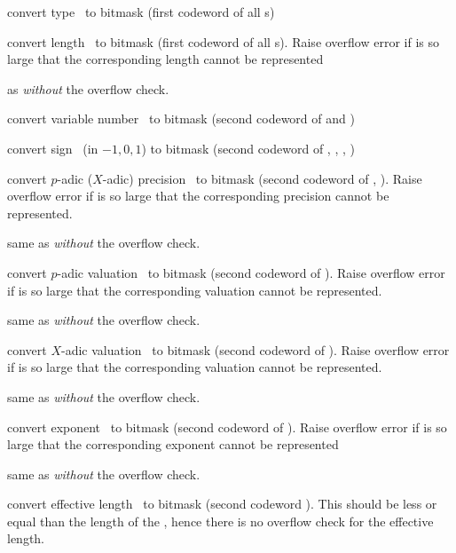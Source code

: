  convert type~ to bitmask (first
codeword of all s)

 convert length~ to bitmask (first
codeword of all s). Raise overflow error if  is so large that
the corresponding length cannot be represented

 as  \emph{without} the overflow
check.

 convert variable number~ to bitmask
(second codeword of  and )

 convert sign~ (in $-1,0,1$) to bitmask
(second codeword of , , , )

 convert $p$-adic ($X$-adic) precision~
to bitmask (second codeword of , ). Raise overflow error
if  is so large that the corresponding precision cannot be
represented.

 same as  \emph{without} the
overflow check.

 convert $p$-adic valuation~ to
bitmask (second codeword of ). Raise overflow error if
 is so large that the corresponding valuation cannot be represented.

 same as  \emph{without} the
overflow check.

 convert $X$-adic valuation~ to
bitmask (second codeword of ). Raise overflow error if
 is so large that the corresponding valuation cannot be represented.

 same as  \emph{without} the
overflow check.

 convert exponent~ to bitmask (second
codeword of ). Raise overflow error if  is so
large that the corresponding exponent cannot be represented

 same as  \emph{without} the
overflow check.

 convert effective length~ to bitmask
(second codeword ). This should be less or equal than the length
of the , hence there is no overflow check for the effective length.

